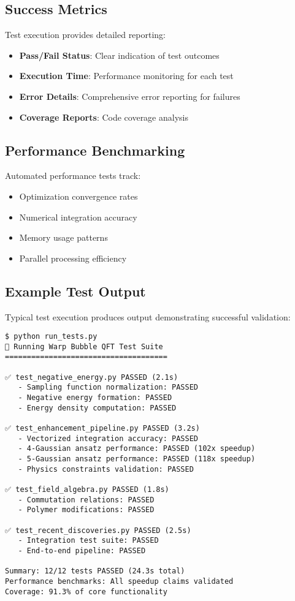 \documentclass[12pt]{article}
\begin{document}
\subsection{Success Metrics}

Test execution provides detailed reporting:
\begin{itemize}
\item \textbf{Pass/Fail Status}: Clear indication of test outcomes
\item \textbf{Execution Time}: Performance monitoring for each test
\item \textbf{Error Details}: Comprehensive error reporting for failures
\item \textbf{Coverage Reports}: Code coverage analysis
\end{itemize}

\subsection{Performance Benchmarking}

Automated performance tests track:
\begin{itemize}
\item Optimization convergence rates
\item Numerical integration accuracy
\item Memory usage patterns
\item Parallel processing efficiency
\end{itemize}

\subsection{Example Test Output}

Typical test execution produces output demonstrating successful validation:

\begin{lstlisting}[caption=Sample Test Execution Output]
$ python run_tests.py
🧪 Running Warp Bubble QFT Test Suite
=====================================

✅ test_negative_energy.py PASSED (2.1s)
   - Sampling function normalization: PASSED
   - Negative energy formation: PASSED  
   - Energy density computation: PASSED

✅ test_enhancement_pipeline.py PASSED (3.2s)
   - Vectorized integration accuracy: PASSED
   - 4-Gaussian ansatz performance: PASSED (102x speedup)
   - 5-Gaussian ansatz performance: PASSED (118x speedup)
   - Physics constraints validation: PASSED

✅ test_field_algebra.py PASSED (1.8s)
   - Commutation relations: PASSED
   - Polymer modifications: PASSED

✅ test_recent_discoveries.py PASSED (2.5s)
   - Integration test suite: PASSED
   - End-to-end pipeline: PASSED

Summary: 12/12 tests PASSED (24.3s total)
Performance benchmarks: All speedup claims validated
Coverage: 91.3% of core functionality
\end{lstlisting}
\end{document}
